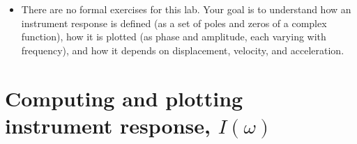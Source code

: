 \documentclass[11pt,titlepage,fleqn]{article}
\begin{document}
\begin{itemize}

\item There are no formal exercises for this lab. Your goal is to understand how an instrument response is defined (\eg as a set of poles and zeros of a complex function), how it is plotted (\eg as phase and amplitude, each varying with frequency), and how it depends on displacement, velocity, and acceleration.

\end{itemize}


\section{Computing and plotting instrument response, $I(\omega)$}
\end{document}
